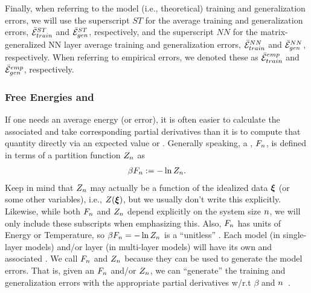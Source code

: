 
Finally, when referring to the model (i.e., theoretical)
training and generalization errors, we will use the superscript $ST$ for
the average \StudentTeacher training and generalization errors, $\bar{\mathcal{E}}^{ST}_{train}$ and $\bar{\mathcal{E}}^{ST}_{gen}$, respectively, and
the superscript $NN$ for the matrix-generalized NN layer average
training and generalization errors, $\bar{\mathcal{E}}^{NN}_{train}$ and $\bar{\mathcal{E}}^{NN}_{gen}$, respectively.
When referring to empirical errors, we denoted these as $\bar{\mathcal{E}}^{emp}_{train}$ and $\bar{\mathcal{E}}^{emp}_{gen}$, respectively.


\subsubsection{Free Energies and \GeneratingFunctions} 
\label{sxn:mathP_free_energies}

If one needs an average energy (or error), 
it is often easier to calculate the associated \FreeEnergy and take corresponding partial derivatives
than it is to compute that quantity directly via an expected value or \ThermalAverage.
Generally speaking, a \FreeEnergy, $F_{n}$, is defined in terms of a partition function $Z_{n}$ as
\begin{align}
\label{eqn:F}
\beta F_{n}:=-\ln Z_{n}.
\end{align}
Keep in mind that $Z_{n}$ may actually be a function of the idealized data $\boldsymbol{\xi}$ (or some other variables),
i.e., $Z(\boldsymbol{\xi})$, but we usually don't write this explicitly.
Likewise, while  both $F_{n}$ and $Z_{n}$ depend explicitly on the system size $n$,
we will only include these subscripts when emphasizing this.
Also, $F_{n}$ has units of Energy or Temperature, so $\beta F_{n}=-\ln Z_{n}$ is a ``unitless'' \FreeEnergy.
%
Each model (in single-layer models) and/or layer (in multi-layer models) will have its own \PartitionFunction and associated \GeneratingFunctions.
We call $F_{n}$ and $Z_{n}$ \emph{\GeneratingFunctions} because they can be used to generate the model errors. 
That is, given an $F_{n}$ and/or $Z_{n}$, we can ``generate'' the training and generalization errors with the appropriate partial derivatives w/r.t $\beta$ and $n$~\cite{LTS90, Solla2023}.

